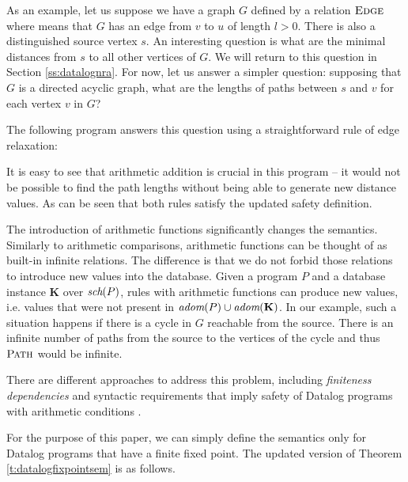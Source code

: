 \begin{exmp}

As an example, let us suppose we have a graph $G$ defined by a relation $\textsc{Edge}$ 
where  means that $G$ has an edge from $v$ to $u$ of length $l > 0$. 
There is also a distinguished source vertex $s$.
An interesting question is what are the minimal distances from $s$ to all other vertices of $G$.
We will return to this question in Section \ref{ss:datalognra}.
For now, let us answer a simpler question: supposing that $G$ is a directed acyclic graph, what are the lengths of paths between $s$ and $v$ for each vertex $v$ in $G$?

The following program answers this question using a straightforward rule of edge relaxation:


It is easy to see that arithmetic addition is crucial in this program -- it would not be possible to find the path lengths without being able to generate new distance values. As can be seen that both rules satisfy the updated safety definition.
\end{exmp}

The introduction of arithmetic functions significantly changes the semantics.
Similarly to arithmetic comparisons, arithmetic functions can be thought of as built-in infinite relations. 
The difference is that we do not forbid those relations to introduce new values into the database.
Given a program $P$ and a database instance $\textbf{K}$ over $\textit{sch}(P)$, rules with arithmetic functions can produce new values, i.e. values that were not present in $\textit{adom}(P) \cup \textit{adom}(\textbf{K})$. In our example, such a situation happens if there is a cycle in $G$ reachable from the source. There is an infinite number of paths from the source to the vertices of the cycle and thus $\textsc{Path}$ would be infinite.

There are different approaches to address this problem, including \emph{finiteness dependencies} and syntactic requirements that imply safety of Datalog programs with arithmetic conditions \cite{RBS87, KRS88a, KRS88b, SV89}.

For the purpose of this paper, we can simply define the semantics only for Datalog programs that have a finite fixed point. The updated version of Theorem \ref{t:datalogfixpointsem} is as follows.

